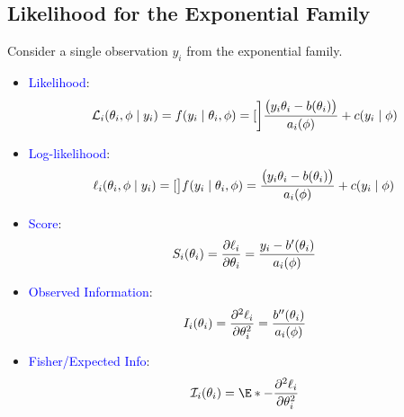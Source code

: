 \documentclass[oneside]{book}\usepackage[]{graphicx}\usepackage[svgnames]{xcolor}
\let\exp\relax%
\let\log\relax%
\begin{document}
\subsection*{Likelihood for the Exponential Family}
Consider a single observation $ y_i $ from the exponential family.
\begin{itemize}
      \item \textcolor{Blue}{Likelihood}:
            \[ \mathcal{L}_i(\theta_i,\phi\mid y_i)=f(y_i\mid \theta_i,\phi)=\exp[\bigg]{\frac{\bigl(y_i\theta_i-b(\theta_i)\bigr)}{a_i(\phi)}+c(y_i\mid \phi)} \]
      \item \textcolor{Blue}{Log-likelihood}:
            \[ \ell_i(\theta_i,\phi\mid y_i)=\log[\big]{f(y_i\mid \theta_i,\phi)}=\frac{\bigl(y_i\theta_i-b(\theta_i)\bigr)}{a_i(\phi)}+c(y_i\mid \phi) \]
      \item \textcolor{Blue}{Score}:
            \[ S_i(\theta_i)=\pdv{\ell_i}{\theta_i}=\frac{y_i-b^\prime(\theta_i)}{a_i(\phi)} \]
      \item \textcolor{Blue}{Observed Information}:
            \[ I_i(\theta_i)=\pdv[order=2]{\ell_i}{\theta_i}=\frac{b^{\prime\prime}(\theta_i)}{a_i(\phi)} \]
      \item \textcolor{Blue}{Fisher/Expected Info}:
            \[ \mathcal{I}_i(\theta_i)=\E*{-\pdv[order=2]{\ell_i}{\theta_i}} \]
\end{itemize}
\end{document}
